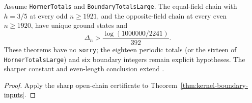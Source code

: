 \begin{theorem}
  \label{thm:kernel-boundary-integers}
  \leanok
  Assume \texttt{HornerTotals} and \texttt{BoundaryTotalsLarge}.
  The equal-field chain with \(h=3/5\) at every odd \(n\ge1921\), and the opposite-field chain
  at every even \(n\ge1920\), have unique ground states and
  \[
    \Delta_n>\frac{\log(1000000/2241)}{392}.
  \]
  These theorems have no \texttt{sorry}; the eighteen periodic totals (or the sixteen of
  \texttt{HornerTotalsLarge}) and six boundary integers remain explicit hypotheses.
  The sharper constant and even-length conclusion extend
  \cite[Theorem 1.1]{OpenAIBoundary}.
\end{theorem}
\begin{proof}
  \leanok
  Apply the sharp open-chain certificate to Theorem~\ref{thm:kernel-boundary-inputs}.
\end{proof}
